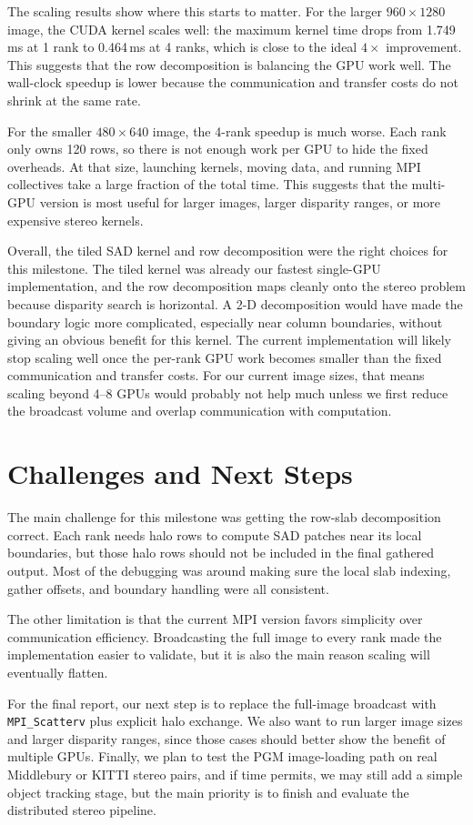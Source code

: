 \documentclass[11pt]{article}
\begin{document}
The scaling results show where this starts to matter. For the larger
$960\times1280$ image, the CUDA kernel scales well: the maximum kernel time drops
from 1.749\,ms at 1 rank to 0.464\,ms at 4 ranks, which is close to the ideal
$4\times$ improvement. This suggests that the row decomposition is balancing the GPU
work well. The wall-clock speedup is lower because the communication and transfer
costs do not shrink at the same rate.

For the smaller $480\times640$ image, the 4-rank speedup is much worse. Each rank
only owns 120 rows, so there is not enough work per GPU to hide the fixed overheads.
At that size, launching kernels, moving data, and running MPI collectives take a large
fraction of the total time. This suggests that the multi-GPU version is most useful
for larger images, larger disparity ranges, or more expensive stereo kernels.

Overall, the tiled SAD kernel and row decomposition were the right choices for this
milestone. The tiled kernel was already our fastest single-GPU implementation, and
the row decomposition maps cleanly onto the stereo problem because disparity search is
horizontal. A 2-D decomposition would have made the boundary logic more complicated,
especially near column boundaries, without giving an obvious benefit for this kernel.
The current implementation will likely stop scaling well once the per-rank GPU work
becomes smaller than the fixed communication and transfer costs. For our current image
sizes, that means scaling beyond 4--8 GPUs would probably not help much unless we
first reduce the broadcast volume and overlap communication with computation.

\section{Challenges and Next Steps}

The main challenge for this milestone was getting the row-slab decomposition correct.
Each rank needs halo rows to compute SAD patches near its local boundaries, but those
halo rows should not be included in the final gathered output. Most of the debugging
was around making sure the local slab indexing, gather offsets, and boundary handling
were all consistent.

The other limitation is that the current MPI version favors simplicity over
communication efficiency. Broadcasting the full image to every rank made the
implementation easier to validate, but it is also the main reason scaling will
eventually flatten.

For the final report, our next step is to replace the full-image broadcast with
\texttt{MPI\_Scatterv} plus explicit halo exchange. We also want to run larger image
sizes and larger disparity ranges, since those cases should better show the benefit of
multiple GPUs. Finally, we plan to test the PGM image-loading path on real Middlebury
or KITTI stereo pairs, and if time permits, we may still add a simple object tracking stage, but the main priority is to finish and evaluate the distributed stereo pipeline.
\end{document}
